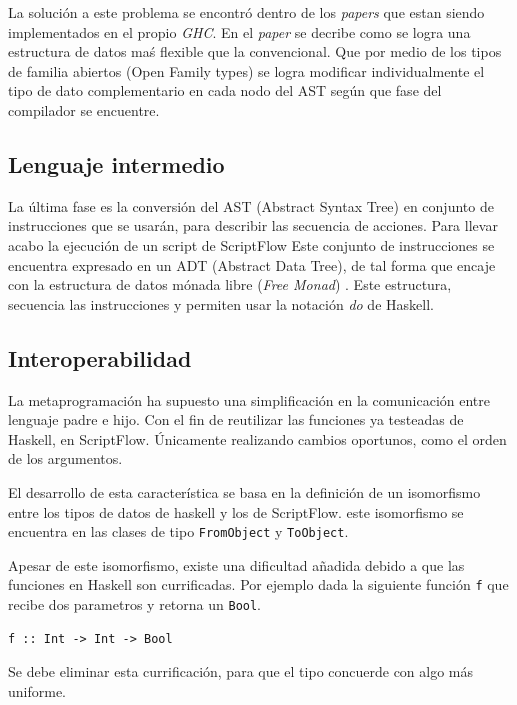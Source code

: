 \documentclass[11pt]{article}
\begin{document}
La solución a este problema se encontró dentro de los \emph{papers} que estan siendo implementados en el propio \emph{GHC}. En el \emph{paper} \cite{shayan-2017-trees}
se decribe como se logra una estructura de datos maś flexible que la convencional. Que por medio de los tipos de familia abiertos (Open Family types)
se logra modificar individualmente el tipo de dato complementario en cada nodo del AST según que fase del compilador se encuentre.

\subsection{Lenguaje intermedio}
\label{sec:org21c1ade}

\label{org2d7b7fc} La última fase es la conversión del AST (Abstract Syntax Tree) en conjunto de instrucciones
que se usarán, para describir las secuencia de acciones. Para llevar acabo la ejecución de un script de ScriptFlow
Este conjunto de instrucciones se encuentra expresado en un ADT (Abstract Data Tree), de tal forma que encaje con la estructura
de datos mónada libre (\emph{Free Monad}) \cite{free-monads}. Este estructura, secuencia las instrucciones y permiten usar la notación \emph{do} de Haskell.

\subsection{Interoperabilidad}
\label{sec:org62e9735}

La metaprogramación ha supuesto una simplificación en la comunicación entre lenguaje padre e hijo. Con el fin de reutilizar las funciones
ya testeadas de Haskell, en ScriptFlow. Únicamente realizando cambios oportunos, como el orden de los argumentos.

El desarrollo de esta característica se basa en la definición de un isomorfismo entre los tipos de datos de haskell y los de ScriptFlow.
este isomorfismo se encuentra en las clases de tipo \texttt{FromObject} y \texttt{ToObject}.

Apesar de este isomorfismo, existe una dificultad añadida debido a que las funciones en Haskell son currificadas. Por ejemplo dada la siguiente
función \texttt{f} que recibe dos parametros y retorna un \texttt{Bool}.

\begin{verbatim}
f :: Int -> Int -> Bool
\end{verbatim}

Se debe eliminar esta currificación, para que el tipo concuerde con algo más uniforme.
\end{document}
